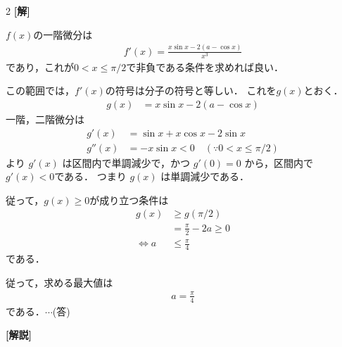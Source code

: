 \documentclass[../../../../main.tex]{subfiles}
\begin{document}
\setcounter{equation}{0}
\begin{oframed}
  
\end{oframed}
\setlength{\columnseprule}{0.4pt}
\begin{multicols}{2}
  {\bf[解]}

  $f(x)$の一階微分は
  \begin{align*}
    f'(x) = \frac{x\sin x-2(a-\cos x)}{x^3}
  \end{align*}
  であり，これが$0 < x \le \pi/2$で非負である条件を求めれば良い．

  この範囲では，$f'(x)$の符号は分子の符号と等しい．
  これを$g(x)$とおく．
  \begin{align*}
    g(x) & = x\sin x - 2(a-\cos x)
  \end{align*}
  一階，二階微分は
  \begin{align*}
    g'(x)  & = \sin x + x\cos x - 2\sin x                    \\
    g''(x) & = -x\sin x < 0 \quad (\because 0 < x \le \pi/2)
  \end{align*}
  より $g'(x)$ は区間内で単調減少で，かつ $g'(0) = 0$ から，区間内で$g'(x) < 0$である．
  つまり $g(x)$ は単調減少である．

  従って，$g(x)\ge 0$が成り立つ条件は
  \begin{align*}
    g(x)
      & \ge g(\pi/2)               \\
      & = \frac{\pi}{2} - 2a \ge 0 \\
    \iff
    a & \le \frac{\pi}{4}
  \end{align*}
  である．

  従って，求める最大値は
  \begin{align*}
    a=\frac{\pi}{4}
  \end{align*}
  である．$\cdots$(答)

  \vspace{10pt}
  {\bf[解説]}

  \newpage
\end{multicols}
\end{document}
